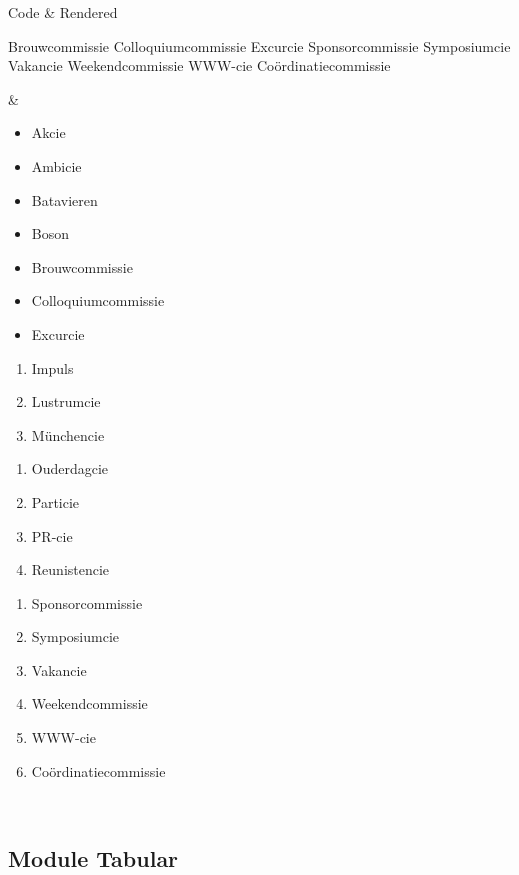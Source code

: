 \begin{page}
\begin{tabular}[l|l]
Code & Rendered \\
\hline
\begin{code}[latex]
     Brouwcommissie
     Colloquiumcommissie
     Excurcie
     Sponsorcommissie
     Symposiumcie
     Vakancie
     Weekendcommissie
     WWW-cie
     Co\"ordinatiecommissie
\end{code}
&
\begin{itemize}
    \item{Akcie}
    \item{Ambicie}
    \item{Batavieren}
    \item{Boson}
\end{itemize}
\begin{itemize}
    \item{Brouwcommissie}
    \item{Colloquiumcommissie}
    \item{Excurcie}
\end{itemize}
\begin{enumerate}
    \item{Impuls}
    \item{Lustrumcie}
    \item{M\"unchencie}
\end{enumerate}
\begin{enumerate}
    \item{Ouderdagcie}
    \item{Particie}
    \item{PR-cie}
    \item{Reunistencie}
\end{enumerate}
\begin{enumerate}
    \item{Sponsorcommissie}
    \item{Symposiumcie}
    \item{Vakancie}
    \item{Weekendcommissie}
    \item{WWW-cie}
    \item{Co\"ordinatiecommissie}
\end{enumerate}
\\
\end{tabular}

\subsection{Module Tabular}


\end{page}